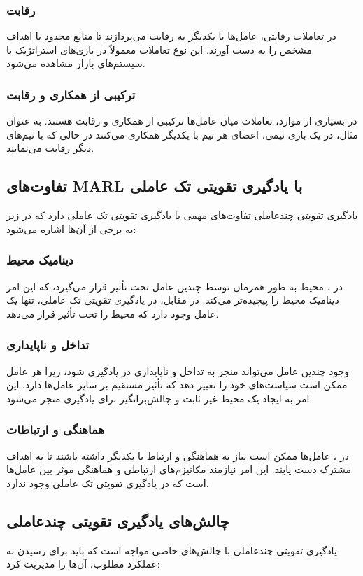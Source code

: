\subsubsection{رقابت}
در تعاملات رقابتی، عامل‌ها با یکدیگر به رقابت می‌پردازند تا منابع محدود یا اهداف مشخص را به دست آورند. این نوع تعاملات معمولاً در بازی‌های استراتژیک یا سیستم‌های بازار مشاهده می‌شود.

\subsubsection{ترکیبی از همکاری و رقابت}
در بسیاری از موارد، تعاملات میان عامل‌ها ترکیبی از همکاری و رقابت هستند. به عنوان مثال، در یک بازی تیمی، اعضای هر تیم با یکدیگر همکاری می‌کنند در حالی که با تیم‌های دیگر رقابت می‌نمایند.

\subsection{تفاوت‌های MARL با یادگیری تقویتی تک عاملی}
یادگیری تقویتی چندعاملی تفاوت‌های مهمی با یادگیری تقویتی تک عاملی دارد که در زیر به برخی از آن‌ها اشاره می‌شود:

\subsubsection{دینامیک محیط}
در ، محیط به طور همزمان توسط چندین عامل تحت تأثیر قرار می‌گیرد، که این امر دینامیک محیط را پیچیده‌تر می‌کند. در مقابل، در یادگیری تقویتی تک عاملی، تنها یک عامل وجود دارد که محیط را تحت تأثیر قرار می‌دهد.

\subsubsection{تداخل و ناپایداری}
وجود چندین عامل می‌تواند منجر به تداخل و ناپایداری در یادگیری شود، زیرا هر عامل ممکن است سیاست‌های خود را تغییر دهد که تأثیر مستقیم بر سایر عامل‌ها دارد. این امر به ایجاد یک محیط غیر ثابت و چالش‌برانگیز برای یادگیری منجر می‌شود.

\subsubsection{هماهنگی و ارتباطات}
در ، عامل‌ها ممکن است نیاز به هماهنگی و ارتباط با یکدیگر داشته باشند تا به اهداف مشترک دست یابند. این امر نیازمند مکانیزم‌های ارتباطی و هماهنگی موثر بین عامل‌ها است که در یادگیری تقویتی تک عاملی وجود ندارد.

\subsection{چالش‌های یادگیری تقویتی چندعاملی}
یادگیری تقویتی چندعاملی با چالش‌های خاصی مواجه است که باید برای رسیدن به عملکرد مطلوب، آن‌ها را مدیریت کرد:

